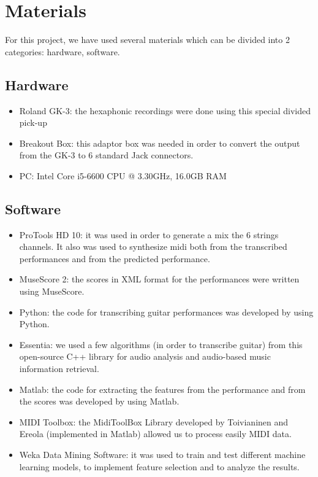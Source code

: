 \chapter{Materials}
\label{chap:materials}
For this project, we have used several materials which can be divided into 2 categories: hardware, software.

\section*{Hardware}
\begin{itemize}[noitemsep]
\item Roland GK-3: the hexaphonic recordings were done using this special divided pick-up
\item Breakout Box: this adaptor box was needed in order to convert the output from the GK-3 to 6 standard Jack connectors.
\item PC: Intel Core i5-6600 CPU @ 3.30GHz, 16.0GB RAM
\end{itemize}

\section*{Software}
\begin{itemize}[noitemsep]
\item ProTools HD 10: it was used in order to generate a mix the 6 strings channels. It also was used to synthesize midi both from the transcribed performances and from the predicted performance.
\item MuseScore 2: the scores in XML format for the performances were written using MuseScore.
\item Python: the code for transcribing guitar performances was developed by using Python.
\item Essentia: we used a few algorithms (in order to transcribe guitar) from this open-source C++ library for audio analysis and audio-based music information retrieval.
\item Matlab: the code for extracting the features from the performance and from the scores was developed by using Matlab.
\item MIDI Toolbox: the MidiToolBox Library developed by Toivianinen and Ereola (implemented in Matlab) allowed us to process easily MIDI data.
\item Weka Data Mining Software: it was used to train and test different machine learning models, to implement feature selection and to analyze the results.
\end{itemize}

\cleardoublepage